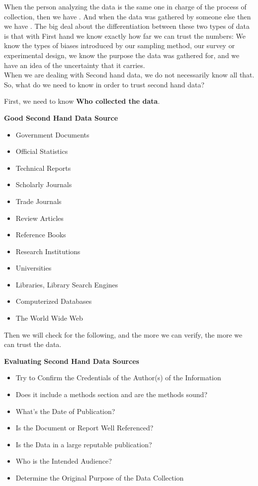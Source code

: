 When the person analyzing the data is the same one in charge of the process of collection, then we have . And when the data was gathered by someone else then we have . The big deal about the differentiation between these two types of data is that with First hand we know exactly how far we can trust the numbers: We know the types of biases introduced by our sampling method, our survey or experimental design, we know the purpose the data was gathered for, and we have an idea of the uncertainty that it carries. 
\\

When we are dealing with Second hand data, we do not necessarily know all that. So, what do we need to know in order to trust second hand data?

First, we need to know \textbf{Who collected the data}.
 
\newpage

\begin{center}
\textbf{Good Second Hand Data Source}
\end{center}

\begin{multicols}{2}
\begin{itemize}
\item Government Documents
\item Official Statistics
\item Technical Reports
\item Scholarly Journals
\item Trade Journals
\item Review Articles
\item Reference Books
\item Research Institutions
\item Universities
\item Libraries, Library Search Engines
\item Computerized Databases
\item The World Wide Web 
\end{itemize}
\end{multicols}

Then we will check for the following, and the more we can verify, the more we can trust the data.
\begin{center}
\textbf{Evaluating Second Hand Data Sources}
\end{center}

\begin{itemize}
\item Try to Confirm the Credentials of the Author(s) of the Information
\item Does it include a methods section and are the methods sound?
\item What’s the Date of Publication? 
\item Is the Document or Report Well Referenced?
\item Is the Data in a large reputable publication?
\item Who is the Intended Audience?
\item Determine the Original Purpose of the Data Collection
\end{itemize}

